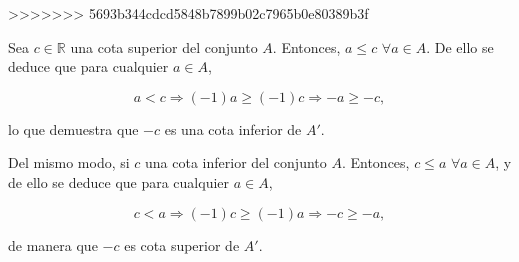 \documentclass[
  a4paper,
]{scrreport}
\theoremstyle{definition}
\theoremstyle{remark}
\begin{document}
\begin{tcolorbox}
\begin{tcolorbox}
\begin{tcolorbox}
\begin{tcolorbox}
\begin{tcolorbox}
\begin{tcolorbox}
\begin{tcolorbox}
\begin{tcolorbox}
\begin{tcolorbox}
\begin{tcolorbox}
\begin{tcolorbox}
\begin{tcolorbox}
\begin{tcolorbox}
\begin{tcolorbox}
\begin{tcolorbox}
\begin{tcolorbox}
\begin{tcolorbox}
\begin{tcolorbox}
\begin{tcolorbox}
\begin{tcolorbox}
\begin{tcolorbox}
\begin{tcolorbox}
\begin{tcolorbox}
\begin{tcolorbox}
\begin{tcolorbox}
\begin{tcolorbox}
\begin{tcolorbox}
\begin{tcolorbox}
\begin{tcolorbox}
\begin{tcolorbox}
\begin{tcolorbox}
\begin{tcolorbox}
\begin{tcolorbox}
\begin{tcolorbox}
\begin{tcolorbox}
\begin{tcolorbox}
\begin{tcolorbox}
\begin{tcolorbox}
\begin{tcolorbox}
\begin{tcolorbox}
\begin{tcolorbox}
\begin{tcolorbox}
\begin{tcolorbox}
\begin{tcolorbox}
\begin{tcolorbox}
\begin{tcolorbox}
\begin{tcolorbox}
\begin{tcolorbox}
\begin{tcolorbox}
\begin{tcolorbox}
\begin{tcolorbox}
\begin{tcolorbox}
\begin{tcolorbox}
\begin{tcolorbox}
\begin{tcolorbox}
\begin{tcolorbox}
\begin{tcolorbox}[enhanced jigsaw, rightrule=.15mm, colbacktitle=quarto-callout-tip-color!10!white, breakable, bottomrule=.15mm, toprule=.15mm, titlerule=0mm, opacitybacktitle=0.6, opacityback=0, colback=white, leftrule=.75mm, bottomtitle=1mm, colframe=quarto-callout-tip-color-frame, toptitle=1mm, title=\textcolor{quarto-callout-tip-color}{\faLightbulb}\hspace{0.5em}{Solución}, arc=.35mm, left=2mm, coltitle=black]
>>>>>>> 5693b344cdcd5848b7899b02c7965b0e80389b3f

Sea \(c\in\mathbb{R}\) una cota superior del conjunto \(A\). Entonces,
\(a\leq c\) \(\forall a\in A\). De ello se deduce que para cualquier
\(a\in A\),

\[
a<c \Rightarrow (-1)a\geq (-1)c \Rightarrow -a\geq -c, 
\]

lo que demuestra que \(-c\) es una cota inferior de \(A'\).

Del mismo modo, si \(c\) una cota inferior del conjunto \(A\). Entonces,
\(c\leq a\) \(\forall a\in A\), y de ello se deduce que para cualquier
\(a\in A\),

\[
c<a \Rightarrow (-1)c\geq (-1)a \Rightarrow -c\geq -a, 
\]

de manera que \(-c\) es cota superior de \(A'\).

\end{tcolorbox}


\end{tcolorbox}
\end{tcolorbox}
\end{tcolorbox}
\end{tcolorbox}
\end{tcolorbox}
\end{tcolorbox}
\end{tcolorbox}
\end{tcolorbox}
\end{tcolorbox}
\end{tcolorbox}
\end{tcolorbox}
\end{tcolorbox}
\end{tcolorbox}
\end{tcolorbox}
\end{tcolorbox}
\end{tcolorbox}
\end{tcolorbox}
\end{tcolorbox}
\end{tcolorbox}
\end{tcolorbox}
\end{tcolorbox}
\end{tcolorbox}
\end{tcolorbox}
\end{tcolorbox}
\end{tcolorbox}
\end{tcolorbox}
\end{tcolorbox}
\end{tcolorbox}
\end{tcolorbox}
\end{tcolorbox}
\end{tcolorbox}
\end{tcolorbox}
\end{tcolorbox}
\end{tcolorbox}
\end{tcolorbox}
\end{tcolorbox}
\end{tcolorbox}
\end{tcolorbox}
\end{tcolorbox}
\end{tcolorbox}
\end{tcolorbox}
\end{tcolorbox}
\end{tcolorbox}
\end{tcolorbox}
\end{tcolorbox}
\end{tcolorbox}
\end{tcolorbox}
\end{tcolorbox}
\end{tcolorbox}
\end{tcolorbox}
\end{tcolorbox}
\end{tcolorbox}
\end{tcolorbox}
\end{tcolorbox}
\end{tcolorbox}
\end{tcolorbox}
\end{document}
